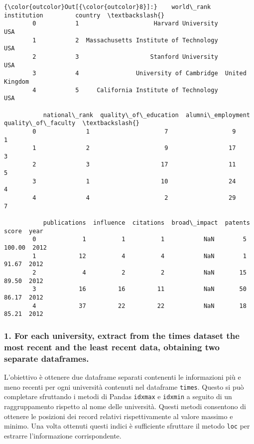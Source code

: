 \documentclass[11pt]{article}
\begin{document}
\begin{Verbatim}[commandchars=\\\{\}]
{\color{outcolor}Out[{\color{outcolor}8}]:}    world\_rank                            institution         country  \textbackslash{}
        0           1                     Harvard University             USA   
        1           2  Massachusetts Institute of Technology             USA   
        2           3                    Stanford University             USA   
        3           4                University of Cambridge  United Kingdom   
        4           5     California Institute of Technology             USA   
        
           national\_rank  quality\_of\_education  alumni\_employment  quality\_of\_faculty  \textbackslash{}
        0              1                     7                  9                   1   
        1              2                     9                 17                   3   
        2              3                    17                 11                   5   
        3              1                    10                 24                   4   
        4              4                     2                 29                   7   
        
           publications  influence  citations  broad\_impact  patents   score  year  
        0             1          1          1           NaN        5  100.00  2012  
        1            12          4          4           NaN        1   91.67  2012  
        2             4          2          2           NaN       15   89.50  2012  
        3            16         16         11           NaN       50   86.17  2012  
        4            37         22         22           NaN       18   85.21  2012  
\end{Verbatim}
            
    \hypertarget{for-each-university-extract-from-the-times-dataset-the-most-recent-and-the-least-recent-data-obtaining-two-separate-dataframes.}{%
\subsubsection{1. For each university, extract from the times dataset
the most recent and the least recent data, obtaining two separate
dataframes.}\label{for-each-university-extract-from-the-times-dataset-the-most-recent-and-the-least-recent-data-obtaining-two-separate-dataframes.}}

    L'obiettivo è ottenere due dataframe separati contenenti le informazioni
più e meno recenti per ogni università contenuti nel dataframe
\texttt{times}. Questo si può completare sfruttando i metodi di Pandas
\texttt{idxmax} e \texttt{idxmin} a seguito di un raggruppamento
rispetto al nome delle università. Questi metodi consentono di ottenere
le posizioni dei record relativi rispettivamente al valore massimo e
minimo. Una volta ottenuti questi indici è sufficiente sfruttare il
metodo \texttt{loc} per estrarre l'informazione corrispondente.
\end{document}

